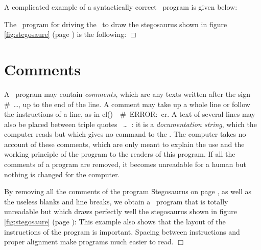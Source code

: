 A complicated example of a syntactically correct \python\ program
is given \hbox{below:}
\begin{exemple}{\rm
The \python\ program for driving the \robot\ to
draw the ste\-go\-saur\-us shown in fig\-ure
\ref{fig:stegosaure} (page \pageref{fig:stegosaure}) is the \hbox{following:}
\label{prog:Stegosaure} 
\noindent $\Box$ }\end{exemple}

\section{Comments}

A \python\ program may contain {\em comments}, which are
any texts written after the sign {\cmt \#\ \ldots}, up to the end of the
line. A comment may take up a whole line or follow the instructions
of a line, as in {\idt cl()\ \ }{\cmt \#\ ERROR:\ cr}.
A text of several lines may also be placed between triple quotes
{\cha {}\ \ldots\ }: it is a
{\em documentation string}, which the computer
reads but which gives no command to the \robot.
The com\-pu\-ter takes no account of these comments, which are only
meant to explain the use and the working principle of the
program to the readers of this program. If all the
comments of a program are removed, it becomes unreadable for a human but
nothing is changed for the com\-pu\-ter.

\begin{exemple}{\rm
By removing all the com\-ments of the program {\idt Stegosaurus}
on page \pageref{prog:Stegosaure}, as well as the useless blanks and line
breaks, we obtain a \python\ program that is
totally unreadable but which draws perfectly well the
ste\-go\-saur\-us shown in fig\-ure
\ref{fig:stegosaure} (page \hbox{\pageref{fig:stegosaure}):}
{\small}
This example also shows that the layout of the instructions of the
program is important. Spacing between instructions and
proper alignment make programs much easier
to read.
\noindent $\Box$ }\end{exemple}



